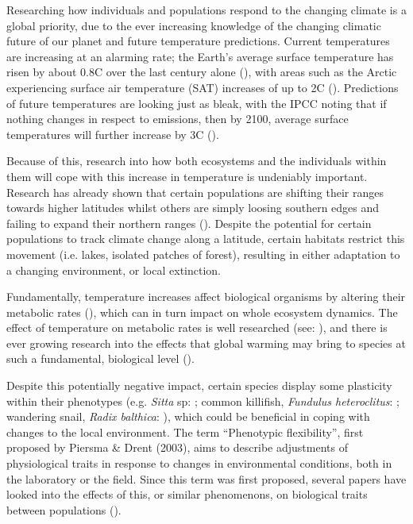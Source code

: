 \documentclass[../../Paper.tex]{subfiles}
\begin{document}
Researching how individuals and populations respond to the changing climate is a global priority,
due to the ever increasing knowledge of the changing climatic future of our planet 
and future temperature predictions. Current temperatures are 
increasing at an alarming rate; the Earth's average surface temperature has risen
by about 0.8\degree C over the last century alone (\cite{ipcc_climate_2014}),
with areas such as the Arctic experiencing surface air temperature (SAT)
increases of up to 2\degree C (\cite{przybylak_recent_2007}). Predictions 
of future temperatures are looking just as bleak, with the IPCC noting 
that if nothing changes in respect to emissions, then by 2100, average surface
temperatures will further increase by 3\degree C (\cite{ipcc_climate_2014}).

Because of this, research into how both ecosystems and the individuals
within them will cope with this increase in temperature is undeniably 
important. Research has already shown that certain populations are 
shifting their ranges towards higher latitudes whilst others
 are simply loosing southern edges and failing to expand their northern ranges
(\cite{chen_rapid_2011, sunday_thermal-safety_2014, kerr_climate_2015}). Despite 
the potential for certain populations to track climate change along a latitude,
certain habitats restrict this movement (i.e. lakes, isolated patches of forest),
resulting in either adaptation to a changing environment, or local extinction.

Fundamentally, temperature increases affect biological organisms by altering
their metabolic rates (\cite{gillooly_effects_2001}), which  can in turn impact 
on whole ecosystem dynamics. The effect of temperature
on metabolic rates is well researched (see: \cite{brown_toward_2004,price_metabolic_2010}), 
and there is  ever growing research into the effects that global warming may bring to species at
such a fundamental, biological level (\cite{clusella-trullas_climatic_2011,manciocco_global_2014,gandar_adaptive_2017}).

Despite this potentially negative impact, certain species display some plasticity within their
phenotypes (e.g. \textit{Sitta} sp: \cite{ghalambor_comparative_2002}; common killifish,
\textit{Fundulus heteroclitus}: \cite{schulte_thermal_2011};
wandering snail, \textit{Radix balthica}: \cite{ahlgren_camouflaged_2013}),
which could be beneficial in coping with changes to the local environment. The term 
``Phenotypic flexibility'', first proposed by Piersma \& Drent (2003), aims to describe
adjustments of physiological traits in response to changes in environmental conditions, 
both in the laboratory or the field. Since this term was first proposed, several papers
have looked into the effects of this, or similar phenomenons, on biological traits between populations 
(\cite{mckechnie_phenotypic_2008,marshall_warming_2011,ahlgren_camouflaged_2013}).
\end{document}
